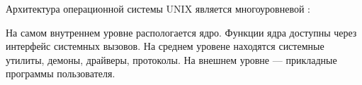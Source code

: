 Архитектура операционной системы UNIX является многоуровневой \cite{UNIXINSIDE}:

На самом внутреннем уровне распологается ядро. Функции ядра доступны через интерфейс системных вызовов. На среднем уровене находятся системные утилиты, демоны, драйверы, протоколы. На внешнем уровне --- прикладные программы пользователя.
